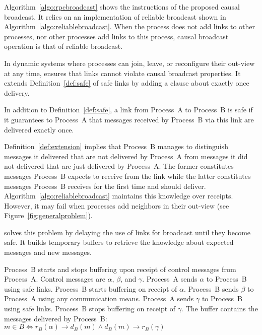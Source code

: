 Algorithm~\ref{algo:rpcbroadcast} shows the instructions of the proposed causal
broadcast. It relies on an implementation of reliable broadcast shown in
Algorithm~\ref{algo:reliablebroadcast}. When the process does not add links to
other processes, nor other processes add links to this process, causal broadcast
operation is that of reliable broadcast. 

In dynamic systems where processes can join, leave, or reconfigure their
out-view at any time, \RPCBROADCAST ensures that links cannot violate causal
broadcast properties. It extends Definition~\ref{def:safe} of safe links by
adding a clause about exactly once delivery. 


\begin{definition}
  In addition to Definition~\ref{def:safe}, a link from Process~A to Process~B
  is safe if it guarantees to Process~A that messages received by Process~B via
  this link are delivered exactly once.
\end{definition}

Definition~\ref{def:extension} implies that Process~B manages to distinguish
messages it delivered that are not delivered by Process~A from messages it did
not delivered that are just delivered by Process~A. The former constitutes
messages Process~B expects to receive from the link while the latter constitutes
messages Process~B receives for the first time and should
deliver. Algorithm~\ref{algo:reliablebroadcast} maintains this knowledge over
receipts. However, it may fail when processes add neighbors in their out-view
(see Figure~\ref{fig:generalproblem}).

\RPCBROADCAST solves this problem by delaying the use of links for broadcast
until they become safe. It builds temporary buffers to retrieve the knowledge
about expected messages and new messages.

\begin{definition}
  Process~B starts and stops buffering upon receipt of control messages from
  Process~A. Control messages are $\alpha$, $\beta$, and $\gamma$. Process~A
  sends $\alpha$ to Process~B using safe links. Process~B starts buffering on
  receipt of $\alpha$. Process~B sends $\beta$ to Process~A using any
  communication means. Process~A sends $\gamma$ to Process~B using safe
  links. Process~B stops buffering on receipt of $\gamma$.
  The buffer contains the messages delivered by Process~B: \\
  $m \in B \Longleftrightarrow 
  r_B(\alpha) \rightarrow d_B(m) \wedge d_B(m) \rightarrow r_B(\gamma)$
\end{definition}

